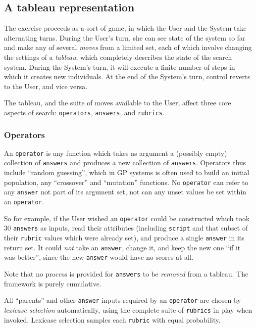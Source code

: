 \subsection{A tableau representation}\hypertarget{a-tableau-representation}{}\label{a-tableau-representation}

The exercise proceeds as a sort of game, in which the User and the System take alternating turns. During the User's turn, she can see state of the system so far and make any of several \emph{moves} from a limited set, each of which involve changing the settings of a \emph{tableau}, which completely describes the state of the search system. During the System's turn, it will execute a finite number of steps in which it creates new individuals. At the end of the System's turn, control reverts to the User, and vice versa.

The tableau, and the suite of moves available to the User, affect three core aspects of search: {\tt operators}, {\tt answers}, and {\tt rubrics}.

\subsubsection{Operators}\hypertarget{operators}{}\label{operators}

An {\tt operator} is any function which takes as argument a (possibly empty) collection of {\tt answers} and produces a new collection of {\tt answers}. Operators thus include ``random guessing'', which in GP systems is often used to build an initial population, any ``crossover'' and ``mutation'' functions. No {\tt operator} can refer to any {\tt answer} not part of its argument set, not can any unset values be set within an {\tt operator}.

So for example, if the User wished an {\tt operator} could be constructed which took 30 {\tt answers} as inputs, read their attributes (including {\tt script} and that subset of their {\tt rubric} values which were already set), and produce a single {\tt answer} in its return set. It could \emph{not} take an {\tt answer}, change it, and keep the new one ``if it was better'', since the new {\tt answer} would have no scores at all.

Note that no process is provided for {\tt answers} to be \emph{removed} from a tableau. The framework is purely cumulative.

All ``parents'' and other {\tt answer} inputs required by an {\tt operator} are chosen by \emph{lexicase selection} automatically, using the complete suite of {\tt rubrics} in play when invoked. Lexicase selection samples each {\tt rubric} with equal probability.

